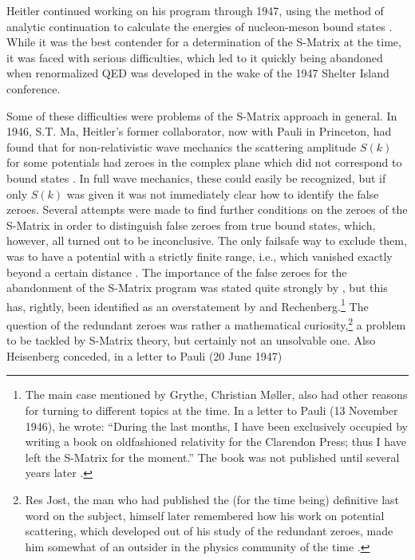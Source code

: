 \documentclass[12pt]{article}
\begin{document}
Heitler continued working on his program through 1947, using the method of analytic continuation to calculate the energies of nucleon-meson bound states \citep{heitler_1947_proton}. While it was the best contender for a determination of the S-Matrix at the time, it was faced with serious difficulties, which led to it quickly being abandoned when renormalized QED was developed in the wake of the 1947 Shelter Island conference.

Some of these difficulties were problems of the S-Matrix approach in general. In 1946, S.T. Ma, Heitler's former collaborator, now with Pauli in Princeton, had found that for non-relativistic wave mechanics the scattering amplitude $S(k)$ for some potentials had zeroes in the complex plane which did not correspond to bound states \citep{ma_1946_redundant}. In full wave mechanics, these could easily be recognized, but if only $S(k)$ was given it was not immediately clear how to identify the false zeroes. Several attempts were made to find further conditions on the zeroes of the S-Matrix in order to distinguish false zeroes from true bound states, which, however, all turned out to be inconclusive. The only failsafe way to exclude them, was to have a potential with a strictly finite range, i.e., which vanished exactly beyond a certain distance \citep{jost_1947_uber-die-falschen}. The importance of the false zeroes for the abandonment of the S-Matrix program was stated quite strongly by \citet{grythe_1982_some}, but this has, rightly, been identified as an overstatement by \citet[p. 319]{cushing_1990_theory} and Rechenberg.\footnote{The main case mentioned by Grythe, Christian M\o ller, also had other reasons for turning to different topics at the time. In a letter to Pauli (13 November 1946), he wrote:  ``During the last months, I have been exclusively occupied by writing a book on oldfashioned relativity for the Clarendon Press; thus I have left the S-Matrix for the moment.'' The book was not published until several years later \citep{moller_1952_the-theory}.} The question of the redundant zeroes was rather a mathematical curiosity,\footnote{Res Jost, the man who had published the (for the time being) definitive last word on the subject, himself later remembered how his work on potential scattering, which developed out of his study of the redundant zeroes, made him somewhat of an outsider in the physics community of the time \citep{jost_1984_erinnerungen}.} a problem to be tackled by S-Matrix theory, but certainly not an unsolvable one. Also Heisenberg conceded, in a letter to Pauli (20 June 1947)
\end{document}
